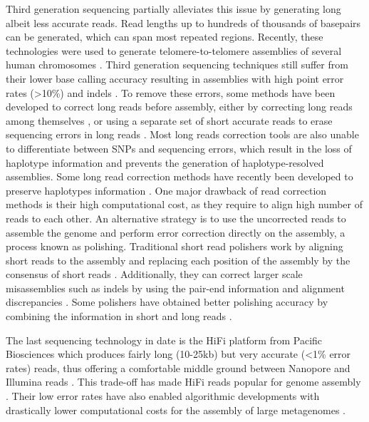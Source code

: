 Third generation sequencing partially alleviates this issue by generating long albeit less accurate reads. Read lengths up to hundreds of thousands of basepairs can be generated, which can span most repeated regions. Recently, these technologies were used to generate telomere-to-telomere assemblies of several human chromosomes \citep{migaTelomeretotelomereAssemblyComplete2020,logsdonStructureFunctionEvolution2021}. Third generation sequencing techniques still suffer from their lower base calling accuracy resulting in assemblies with high point error rates (>10\%) and indels \cite{weiratherComprehensiveComparisonPacific2017,jainNanoporeSequencingAssembly2018}. To remove these errors, some methods have been developed to correct long reads before assembly, either by correcting long reads among themselves \cite{morisseScalableLongRead2021}, or using a separate set of short accurate reads to erase sequencing errors in long reads \cite{wangFMLRCHybridLong2018}. Most long reads correction tools are also unable to differentiate between SNPs and sequencing errors, which result in the loss of haplotype information and prevents the generation of haplotype-resolved assemblies. Some long read correction methods have recently been developed to preserve haplotypes information \cite{holleyRatatoskHybridError2021}. One major drawback of read correction methods is their high computational cost, as they require to align high number of reads to each other. An alternative strategy is to use the uncorrected reads to assemble the genome and perform error correction directly on the assembly, a process known as \Gls{polishing}. Traditional short read polishers work by aligning short reads to the assembly and replacing each position of the assembly by the consensus of short reads \cite{vaserFastAccurateNovo2017}. Additionally, they can correct larger scale misassemblies such as indels by using the pair-end information and alignment discrepancies \cite{walkerPilonIntegratedTool2014}. Some polishers have obtained better polishing accuracy by combining the information in short and long reads \cite{kunduHyPoSuperFast2019}.


The last sequencing technology in date is the HiFi platform from Pacific Biosciences which produces fairly long (10-25kb) but very accurate (<1\% error rates) reads, thus offering a comfortable middle ground between Nanopore and Illumina reads \cite{wengerAccurateCircularConsensus2019}. This trade-off has made HiFi reads popular for genome assembly \cite{langComparisonTwoUptodate2020,chengHaplotyperesolvedNovoAssembly2021,chengHaplotyperesolvedNovoAssembly2021}. Their low error rates have also enabled algorithmic developments with drastically lower computational costs for the assembly of large metagenomes \cite{ekimMinimizerspaceBruijnGraphs2021}.

